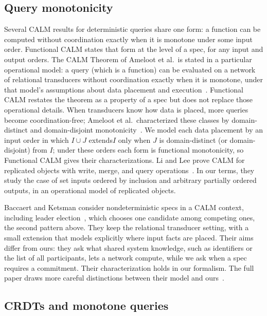 \documentclass[sigconf]{cidr-2027}
\theoremstyle{remark}
\newcommand{\commitment}{commitment\xspace}
\newcommand{\inrel}{extends\xspace}          %
\begin{document}
\subsection{Query monotonicity}
\label{sec:query-instance}

Several CALM results for deterministic queries share one form: a function can
be computed without coordination exactly when it is monotone under some input
order.  Functional CALM states that form at the level of a spec, for any input
and output orders.  The CALM Theorem of Ameloot et al.\ is stated in a
particular operational model: a query (which is a function) can be evaluated on a network of
relational transducers without coordination exactly when it is monotone, under
that model's assumptions about data placement and
execution~\cite{ameloot2013relational,ameloot2015weaker}.  Functional CALM restates the
theorem as a property of a spec but does not replace those operational
details.  When transducers know how data is placed, more queries become
coordination-free; Ameloot et al.\ characterized these classes by
domain-distinct and domain-disjoint
monotonicity~\cite{ameloot2015weaker,zinn2012winmove}.  We model each data
placement by an input order in which $I\cup J$ \inrel $I$ only when $J$ is
domain-distinct (or domain-disjoint) from $I$; under these orders each form is
functional monotonicity, so Functional CALM gives their characterizations.  Li
and Lee prove CALM for replicated objects with write, merge, and query
operations~\cite{li2025coordinationfree}. In our terms, they study the case of set inputs ordered by
inclusion and arbitrary partially ordered outputs, in an operational model of
replicated objects.

Baccaert and Ketsman consider nondeterministic specs in a
CALM context, including leader election~\cite{baccaert2023dcbq,baccaert2026spectrum}, which
chooses one candidate among competing ones, the second pattern above.
They keep the relational transducer setting, with a small extension that models
explicitly where input facts are placed.  Their aims differ from ours: they ask
what shared system knowledge, such as identifiers or the list of all
participants, lets a network compute, while we ask when a spec requires a
\commitment.  Their characterization holds in our
formalism.  The full paper draws more careful distinctions between their model
and ours~\cite{hellerstein2026completecalmfull}.

\subsection{CRDTs and monotone queries}
\label{sec:crdt-instance}
\end{document}
